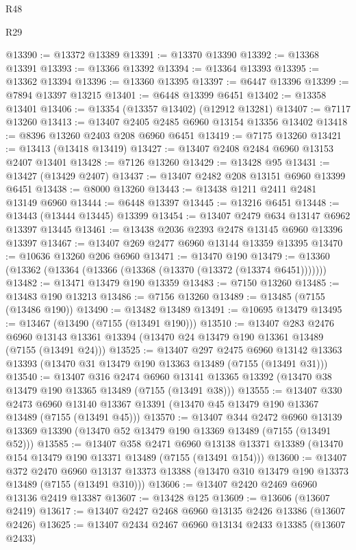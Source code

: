 \begin{lexlean}{R48}
\begin{lexlean}{R29}
\begin{coremodule}
{{{{{{{{{{{{{{{{{{{{{{{{{{{{{{{{{{{{{{{{{{{{{{{{{{{{{{{{{{{{{{{{{{{{{{{{{{{{{{{{{{{{{{{{{{{{{{{{{{{{{{{{{{{{{{{{{{{{{{{{{{{{{{{{{{{{{{{{{{{{{{{{{{{{{{{{{{{{{{{{{{{{{{{{{{{{{{{{{{{{{{{{{{{{{{{{{{{{{{{{{{{{{{{{{{{{{{{{{{@13390 := @13372 @13389
@13391 := @13370 @13390
@13392 := @13368 @13391
@13393 := @13366 @13392
@13394 := @13364 @13393
@13395 := @13362 @13394
@13396 := @13360 @13395
@13397 := @6447 @13396
@13399 := @7894 @13397 @13215
@13401 := @6448 @13399 @6451
@13402 := @13358 @13401
@13406 := @13354 (@13357 @13402) (@12912 @13281)
@13407 := @7117 @13260
@13413 := @13407 @2405 @2485 @6960 @13154 @13356 @13402
@13418 := @8396 @13260 @2403 @208 @6960 @6451
@13419 := @7175 @13260
@13421 := @13413 (@13418 @13419)
@13427 := @13407 @2408 @2484 @6960 @13153 @2407 @13401
@13428 := @7126 @13260
@13429 := @13428 @95
@13431 := @13427 (@13429 @2407)
@13437 := @13407 @2482 @208 @13151 @6960 @13399 @6451
@13438 := @8000 @13260
@13443 := @13438 @1211 @2411 @2481 @13149 @6960
@13444 := @6448 @13397
@13445 := @13216 @6451
@13448 := @13443 (@13444 @13445) @13399
@13454 := @13407 @2479 @634 @13147 @6962 @13397 @13445
@13461 := @13438 @2036 @2393 @2478 @13145 @6960 @13396 @13397
@13467 := @13407 @269 @2477 @6960 @13144 @13359 @13395
@13470 := @10636 @13260 @206 @6960
@13471 := @13470 @190
@13479 := @13360 (@13362 (@13364 (@13366 (@13368 (@13370 (@13372 (@13374 @6451)))))))
@13482 := @13471 @13479 @190 @13359
@13483 := @7150 @13260
@13485 := @13483 @190 @13213
@13486 := @7156 @13260
@13489 := @13485 (@7155 (@13486 @190))
@13490 := @13482 @13489
@13491 := @10695 @13479
@13495 := @13467 (@13490 (@7155 (@13491 @190)))
@13510 := @13407
    @283
    @2476
    @6960
    @13143
    @13361
    @13394
    (@13470 @24 @13479 @190 @13361 @13489 (@7155 (@13491 @24)))
@13525 := @13407
    @297
    @2475
    @6960
    @13142
    @13363
    @13393
    (@13470 @31 @13479 @190 @13363 @13489 (@7155 (@13491 @31)))
@13540 := @13407
    @316
    @2474
    @6960
    @13141
    @13365
    @13392
    (@13470 @38 @13479 @190 @13365 @13489 (@7155 (@13491 @38)))
@13555 := @13407
    @330
    @2473
    @6960
    @13140
    @13367
    @13391
    (@13470 @45 @13479 @190 @13367 @13489 (@7155 (@13491 @45)))
@13570 := @13407
    @344
    @2472
    @6960
    @13139
    @13369
    @13390
    (@13470 @52 @13479 @190 @13369 @13489 (@7155 (@13491 @52)))
@13585 := @13407
    @358
    @2471
    @6960
    @13138
    @13371
    @13389
    (@13470 @154 @13479 @190 @13371 @13489 (@7155 (@13491 @154)))
@13600 := @13407
    @372
    @2470
    @6960
    @13137
    @13373
    @13388
    (@13470 @310 @13479 @190 @13373 @13489 (@7155 (@13491 @310)))
@13606 := @13407 @2420 @2469 @6960 @13136 @2419 @13387
@13607 := @13428 @125
@13609 := @13606 (@13607 @2419)
@13617 := @13407 @2427 @2468 @6960 @13135 @2426 @13386 (@13607 @2426)
@13625 := @13407 @2434 @2467 @6960 @13134 @2433 @13385 (@13607 @2433)
}}}}}}}}}}}}}}}}}}}}}}}}}}}}}}}}}}}}}}}}}}}}}}}}}}}}}}}}}}}}}}}}}}}}}}}}}}}}}}}}}}}}}}}}}}}}}}}}}}}}}}}}}}}}}}}}}}}}}}}}}}}}}}}}}}}}}}}}}}}}}}}}}}}}}}}}}}}}}}}}}}}}}}}}}}}}}}}}}}}}}}}}}}}}}}}}}}}}}}}}}}}}}}}}}}}}}}}}}}
\end{coremodule}
\end{lexlean}
\end{lexlean}
